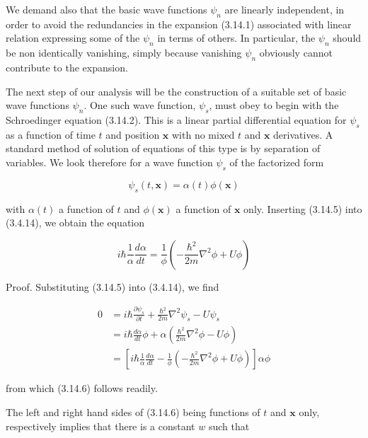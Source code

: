 \documentclass{article}
\begin{document}
We demand also that the basic wave functions $\psi_{n}$ are linearly independent, in order to avoid the redundancies in the expansion (3.14.1) associated with linear relation expressing some of the $\psi_{n}$ in terms of others. In particular, the $\psi_{n}$ should be non identically vanishing, simply because vanishing $\psi_{n}$ obviously cannot contribute to the expansion.

The next step of our analysis will be the construction of a suitable set of basic wave functions $\psi_{n}$. One such wave function, $\psi_{s}$, must obey to begin with the Schroedinger equation (3.14.2). This is a linear partial differential equation for $\psi_{s}$ as a function of time $t$ and position $\boldsymbol{x}$ with no mixed $t$ and $\boldsymbol{x}$ derivatives. A standard method of solution of equations of this type is by separation of variables. We look therefore for a wave function $\psi_{s}$ of the factorized form
 
\begin{equation*}
\psi_{s}(t, \boldsymbol{x})=\alpha(t) \phi(\boldsymbol{x}) \tag{3.14.5}
\end{equation*}
 
with $\alpha(t)$ a function of $t$ and $\phi(\boldsymbol{x})$ a function of $\boldsymbol{x}$ only. Inserting (3.14.5) into
(3.4.14), we obtain the equation
 
\begin{equation*}
i \hbar \frac{1}{\alpha} \frac{d \alpha}{d t}=\frac{1}{\phi}\left(-\frac{\hbar^{2}}{2 m} \nabla^{2} \phi+U \phi\right) \tag{3.14.6}
\end{equation*}
 

Proof. Substituting (3.14.5) into (3.4.14), we find
 
\begin{align*}
0 & =i \hbar \frac{\partial \psi_{s}}{\partial t}+\frac{\hbar^{2}}{2 m} \nabla^{2} \psi_{s}-U \psi_{s}  \tag{3.14.7}\\
& =i \hbar \frac{d \alpha}{d t} \phi+\alpha\left(\frac{\hbar^{2}}{2 m} \nabla^{2} \phi-U \phi\right) \\
& =\left[i \hbar \frac{1}{\alpha} \frac{d \alpha}{d t}-\frac{1}{\phi}\left(-\frac{\hbar^{2}}{2 m} \nabla^{2} \phi+U \phi\right)\right] \alpha \phi
\end{align*}
 
from which (3.14.6) follows readily.

The left and right hand sides of (3.14.6) being functions of $t$ and $\boldsymbol{x}$ only, respectively implies that there is a constant $w$ such that
 
\end{document}
